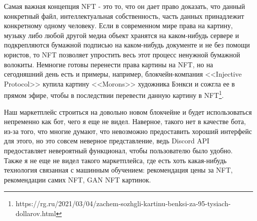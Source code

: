 Самая важная концепция NFT - это то, что он дает право доказать, что данный конкретный файл, интеллектуальная собственность, часть данных принадлежит конкретному одному человеку. Если в современном мире права на картину, музыку либо любой другой медиа объект хранятся на каком-нибудь сервере и подкрепляются бумажной подписью на каком-нибудь документе и не без помощи юристов, то NFT позволяет упростить весь этот процесс ненужной бумажной волокиты. Немногие готовы перенести права картины на NFT, но на сегодняшний день есть и примеры, например, блокчейн-компания <<Injective Protocol>> купила картину <<Morons>> художника Бэнкси и сожгла ее в прямом эфире, чтобы в последствии перевести данную картину в NFT\footnote{https://rg.ru/2021/03/04/zachem-sozhgli-kartinu-benksi-za-95-tysiach-dollarov.html}.

Наш маркетплейс строиться на довольно новом блокчейне и будет использоваться непременно как бот, чего я еще не видел. Наверное, такого нет в качестве бота, из-за того, что многие думают, что невозможно предоставить хороший интерфейс для этого, но это совсем неверное представление, ведь Discord API предоставляет невероятный функционал, чтобы пользователю было удобно. Также я не еще не видел такого маркетплейса, где есть хоть какая-нибудь технология связанная с машинным обучением: рекомендация цены за NFT, рекомендации самих NFT, GAN NFT картинок.
